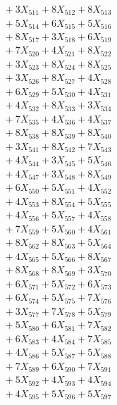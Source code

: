 \documentclass[a4paper,10pt]{article}
\begin{document}
{\begin{align}
&\;  + 3 X_{511} + 8 X_{512} + 8 X_{513} \\[0.3ex]
&\;  + 5 X_{514} + 6 X_{515} + 5 X_{516} \\[0.3ex]
&\;  + 8 X_{517} + 3 X_{518} + 6 X_{519} \\[0.5ex]\allowbreak
&\;  + 7 X_{520} + 4 X_{521} + 8 X_{522} \\[0.3ex]
&\;  + 3 X_{523} + 8 X_{524} + 8 X_{525} \\[0.3ex]
&\;  + 3 X_{526} + 8 X_{527} + 4 X_{528} \\[0.3ex]
&\;  + 6 X_{529} + 5 X_{530} + 4 X_{531} \\[0.3ex]
&\;  + 4 X_{532} + 8 X_{533} + 3 X_{534} \\[0.3ex]
&\;  + 7 X_{535} + 4 X_{536} + 4 X_{537} \\[0.3ex]
&\;  + 8 X_{538} + 8 X_{539} + 8 X_{540} \\[0.3ex]
&\;  + 3 X_{541} + 8 X_{542} + 7 X_{543} \\[0.3ex]
&\;  + 4 X_{544} + 3 X_{545} + 5 X_{546} \\[0.3ex]
&\;  + 4 X_{547} + 3 X_{548} + 8 X_{549} \\[0.5ex]\allowbreak
&\;  + 6 X_{550} + 5 X_{551} + 4 X_{552} \\[0.3ex]
&\;  + 4 X_{553} + 8 X_{554} + 5 X_{555} \\[0.3ex]
&\;  + 4 X_{556} + 5 X_{557} + 4 X_{558} \\[0.3ex]
&\;  + 7 X_{559} + 5 X_{560} + 4 X_{561} \\[0.3ex]
&\;  + 8 X_{562} + 8 X_{563} + 5 X_{564} \\[0.3ex]
&\;  + 4 X_{565} + 5 X_{566} + 8 X_{567} \\[0.3ex]
&\;  + 8 X_{568} + 8 X_{569} + 3 X_{570} \\[0.3ex]
&\;  + 6 X_{571} + 5 X_{572} + 6 X_{573} \\[0.3ex]
&\;  + 6 X_{574} + 5 X_{575} + 7 X_{576} \\[0.3ex]
&\;  + 3 X_{577} + 7 X_{578} + 5 X_{579} \\[0.5ex]\allowbreak
&\;  + 5 X_{580} + 6 X_{581} + 7 X_{582} \\[0.3ex]
&\;  + 6 X_{583} + 4 X_{584} + 7 X_{585} \\[0.3ex]
&\;  + 4 X_{586} + 5 X_{587} + 5 X_{588} \\[0.3ex]
&\;  + 7 X_{589} + 6 X_{590} + 7 X_{591} \\[0.3ex]
&\;  + 5 X_{592} + 4 X_{593} + 4 X_{594} \\[0.3ex]
&\;  + 4 X_{595} + 5 X_{596} + 5 X_{597} \\[0.3ex]

\end{align}}
\end{document}

